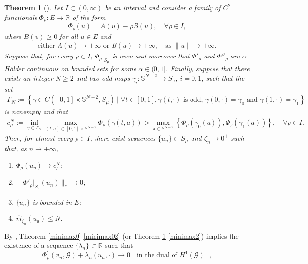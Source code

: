 \documentclass[11pt]{amsart}
\newtheorem{theorem}{Theorem}[section]
\numberwithin{equation}{section}
\begin{document}
\begin{theorem}[{\cite[Theorem 1.12]{Bort0}}]\label{minimax}
	Let \( I \subset (0, \infty) \) be an interval and consider a family of \( C^2 \) functionals \( \Phi_{\rho} : E \to \mathbb{R} \) of the form
	\[
	\Phi_\rho(u) = A(u) - \rho B(u), \quad \forall \rho \in I,
	\]
	where \( B(u) \geq 0 \) for all \( u \in E \) and
    \begin{align}\label{asymptotic}
  \text{either }   A(u) \to +\infty \text{ or } B(u) \to +\infty, \quad \text{as }  \|u\| \to +\infty.
    \end{align}
	Suppose that, for every \( \rho \in I \), \( \Phi_\rho|_{S_\mu} \) is even and moreover that \( \Phi'_\rho \) and \( \Phi''_\rho \) are \( \alpha \)-H\"older continuous on bounded sets for some \( \alpha \in (0, 1] \). Finally, suppose that there exists an integer \( N \geq 2 \) and two odd maps \(\gamma_i:\mathbb{S}^{N-2}\to S_\mu\), \(i=0,1\), such that the set\begin{align}\label{GamN}
	\Gamma_N := \left\{ \gamma \in C([0, 1] \times \mathbb{S}^{N-2}, S_\mu) \mid \forall t \in [0, 1], \gamma(t, \cdot) \text{ is odd, } \gamma(0, \cdot) = \gamma_0 \text{ and } \gamma(1, \cdot) = \gamma_1 \right\}
	\end{align}
	is nonempty and that
\begin{align}\label{strit-ineq}
c_\rho^N := \inf_{\gamma \in \Gamma_N} \max_{(t,a) \in [0, 1] \times \mathbb{S}^{N-2}} \Phi_\rho(\gamma(t, a)) > \max_{a \in \mathbb{S}^{N-2}} \left\{ \Phi_\rho(\gamma_0(a)), \Phi_\rho(\gamma_1(a)) \right\}, \quad \forall \rho \in I.
\end{align}
	Then, for almost every \( \rho \in I \), there exist sequences \(\{u_n\} \subset S_\mu\) and \(\zeta_n \to 0^+\) such that, as \( n \to +\infty \),
	\begin{enumerate}[label=\rm(\roman*)]
		\item \( \Phi_\rho(u_n) \to c_\rho^N \);
		\item \( \|\Phi'_\rho|_{S_\mu}(u_n)\|_* \to 0 \);\label{minimax2}
		\item \(\{u_n\}\) is bounded in \( E \);
		\item \( \hat{m}_{\zeta_n}(u_n) \leq N \).
	\end{enumerate}
\end{theorem}
By \cite[Remark 1.6]{Bort0}, Theorem \ref{minimax0} \ref{minimax02} (or Theorem \ref{minimax} \ref{minimax2}) implies the existence of a sequence $\{\lambda_n\} \subset \mathbb{R}$ such that
\begin{equation}
\Phi^{ \prime}_{\rho}(u_n, \mathcal{G}) + \lambda_n (u_n, \cdot) \to 0 \quad \text{in the dual of $H^1(\mathcal{G})$ },
\end{equation}
\end{document}

